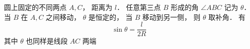 
\begin{issues}
\issueDraft
\end{issues}

圆上固定的不同两点 $A,C$， 距离为 $l$． 任意第三点 $B$ 形成的角 $\angle ABC$ 记为 $\theta$． 当 $B$ 在 $A,C$ 之间移动， $\theta$ 是恒定的， 当 $B$ 移动到另一侧， 则 $\theta$ 取补角． 有
\begin{equation}\label{SphTri_eq1}
\sin\theta = \frac{l}{2R}
\end{equation}
其中 $\theta$ 也同样是线段 $AC$ 两端
